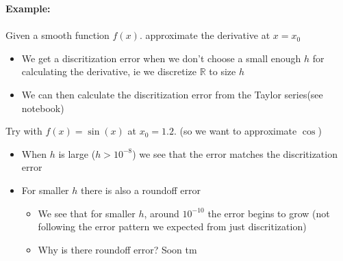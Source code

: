 \documentclass{article}
\newcommand{\R}{\mathbb{R}}
\begin{document}
\begin{example} 
\textbf{Example:}  \\
~\\
Given a smooth function $f(x)$. approximate the derivative at $x=x_0$
\begin{itemize}
	\item We get a discritization error when we don't choose a small enough $h$ for calculating the derivative, ie we discretize $\R$ to size $h$
	\item We can then calculate the discritization error from the Taylor series(see notebook)
\end{itemize}
Try with $f(x) = \sin(x)$ at $x_0 = 1.2$. (so we want to approximate $\cos$)
\begin{itemize}
	\item When $h$ is large ($h>10^{-8}$) we see that the error matches the discritization error
	\item For smaller $h$ there is also a roundoff error
	\begin{itemize}
		\item We see that for smaller $h$, around $10^{-10}$ the error begins to grow (not following the error pattern we expected from just discritization)
		\item Why is there roundoff error? Soon tm
	\end{itemize}
\end{itemize}
\end{example}
\end{document}
